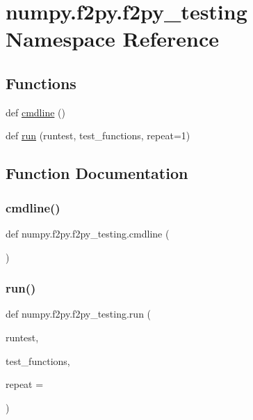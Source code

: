 \hypertarget{namespacenumpy_1_1f2py_1_1f2py__testing}{}\section{numpy.\+f2py.\+f2py\+\_\+testing Namespace Reference}
\label{namespacenumpy_1_1f2py_1_1f2py__testing}
\subsection*{Functions}
\begin{DoxyCompactItemize}
\item 
def \hyperlink{namespacenumpy_1_1f2py_1_1f2py__testing_aab3e2ae68408ffea1f19eac560df0277}{cmdline} ()
\item 
def \hyperlink{namespacenumpy_1_1f2py_1_1f2py__testing_a967ec931e2ac85d0bf33205991edf26f}{run} (runtest, test\+\_\+functions, repeat=1)
\end{DoxyCompactItemize}


\subsection{Function Documentation}
\mbox{\label{namespacenumpy_1_1f2py_1_1f2py__testing_aab3e2ae68408ffea1f19eac560df0277}} 
\subsubsection{\texorpdfstring{cmdline()}{cmdline()}}
{\footnotesize\ttfamily def numpy.\+f2py.\+f2py\+\_\+testing.\+cmdline (\begin{DoxyParamCaption}{ }\end{DoxyParamCaption})}

\mbox{\label{namespacenumpy_1_1f2py_1_1f2py__testing_a967ec931e2ac85d0bf33205991edf26f}} 
\subsubsection{\texorpdfstring{run()}{run()}}
{\footnotesize\ttfamily def numpy.\+f2py.\+f2py\+\_\+testing.\+run (\begin{DoxyParamCaption}\item[{}]{runtest,  }\item[{}]{test\+\_\+functions,  }\item[{}]{repeat = {} }\end{DoxyParamCaption})}

